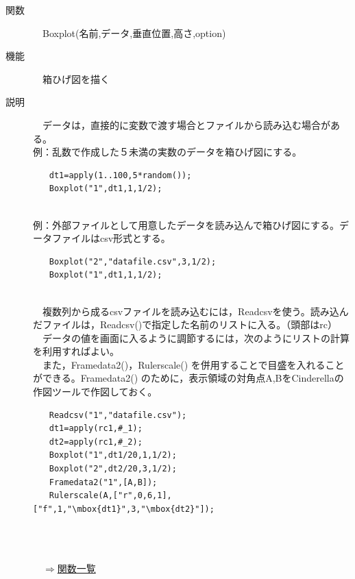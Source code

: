 \documentclass[papersize,a4paper,12pt,uplatex]{jsarticle}
\begin{document}
\begin{description}
\hypertarget{boxplot}{}
\item[関数]　Boxplot(名前,データ,垂直位置,高さ,option)
\item[機能]　箱ひげ図を描く
\item[説明]　データは，直接的に変数で渡す場合とファイルから読み込む場合がある。\\
例：乱数で作成した５未満の実数のデータを箱ひげ図にする。\\
\begin{verbatim}
　　dt1=apply(1..100,5*random());
　　Boxplot("1",dt1,1,1/2);
\end{verbatim}
　\\
例：外部ファイルとして用意したデータを読み込んで箱ひげ図にする。データファイルはcsv形式とする。\\
\begin{verbatim}
　　Boxplot("2","datafile.csv",3,1/2);
　　Boxplot("1",dt1,1,1/2);
\end{verbatim}
　\\
　複数列から成るcsvファイルを読み込むには，Readcsvを使う。読み込んだファイルは，Readcsv()で指定した名前のリストに入る。（頭部はrc）\\
　データの値を画面に入るように調節するには，次のようにリストの計算を利用すればよい。\\
 　また，Framedata2()，Rulerscale() を併用することで目盛を入れることができる。Framedata2() のために，表示領域の対角点A,BをCinderellaの作図ツールで作図しておく。\\
\begin{verbatim}
　　Readcsv("1","datafile.csv");
　　dt1=apply(rc1,#_1);
　　dt2=apply(rc1,#_2);
　　Boxplot("1",dt1/20,1,1/2);
　　Boxplot("2",dt2/20,3,1/2);
　　Framedata2("1",[A,B]);
　　Rulerscale(A,["r",0,6,1],["f",1,"\mbox{dt1}",3,"\mbox{dt2}"]);
\end{verbatim}
　\\
　　　　　\\

\begin{flushright}　\hyperlink{functionlist}{$\Rightarrow$関数一覧}\end{flushright}


\end{description}
\end{document}
